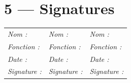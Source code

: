 \documentclass[11pt,a4paper,oneside]{report}
\begin{document}
\section*{5 — Signatures}

\vspace{4pt}
\renewcommand{\arraystretch}{2.5}
\begin{tabularx}{\textwidth}{Y Y Y}
\toprule
{} &  &  \\
\midrule
\textit{Nom :} & \textit{Nom :} & \textit{Nom :} \\
\textit{Fonction :} & \textit{Fonction :} & \textit{Fonction :} \\
\textit{Date :} & \textit{Date :} & \textit{Date :} \\
\textit{Signature :} & \textit{Signature :} & \textit{Signature :} \\
\bottomrule
\end{tabularx}
\end{document}

